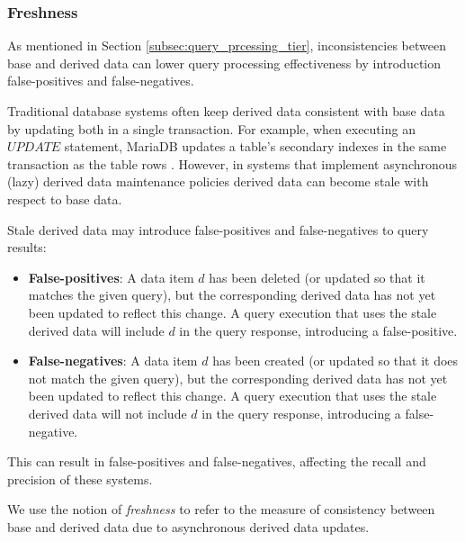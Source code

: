 \subsubsection{Freshness}

As mentioned in Section \ref{subsec:query_prcessing_tier}, inconsistencies between base and derived data can lower query
processing effectiveness by introduction false-positives and false-negatives.

Traditional database systems often keep derived data consistent with base data by updating both in a single transaction.
For example, when executing an $UPDATE$ statement, MariaDB updates a table's secondary indexes in the same transaction
as the table rows \cite{innodb:writepaths}.
However, in systems that implement asynchronous (lazy) derived data maintenance policies \cite{tan:diffindex,
qi:secondaryindexconsistency, shukla:schemaagnostic} derived data can become stale with respect to base data.

Stale derived data may introduce false-positives and false-negatives to query results:
\begin{itemize}
  \item \textbf{False-positives}: A data item $d$ has been deleted (or updated so that it matches the given query),
  but the corresponding derived data has not yet been updated to reflect this change.
  A query execution that uses the stale derived data will include $d$ in the query response, introducing a false-positive.

  \item \textbf{False-negatives}: A data item $d$ has been created (or updated so that it does not match the given query),
  but the corresponding derived data has not yet been updated to reflect this change.
  A query execution that uses the stale derived data will not include $d$ in the query response,
  introducing a false-negative.
\end{itemize}
This can result in false-positives and false-negatives, affecting the recall and precision of these systems.

We use the notion of \textit{freshness} to refer to the measure of consistency between base and derived data due to
asynchronous derived data updates.

